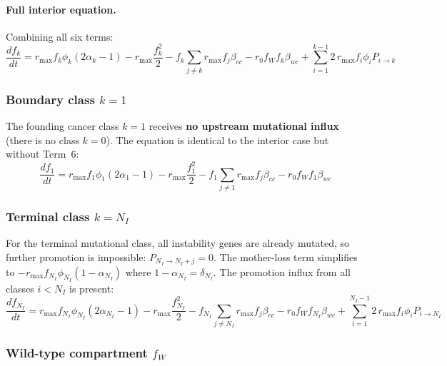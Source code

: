 \documentclass[11pt,a4paper]{article}
\begin{document}
\paragraph{Full interior equation.} Combining all six terms:
\begin{equation}
    \boxed{\frac{df_k}{dt} = r_{\text{max}} f_k \phi_k (2\alpha_k - 1)
    - r_{\text{max}} \frac{f_k^2}{2}
    - f_k \!\sum_{j \neq k}\! r_{\text{max}} f_j \beta_{cc}
    - r_0 f_W f_k \beta_{wc}
    + \sum_{i=1}^{k-1} 2\, r_{\text{max}} f_i \phi_i P_{i \to k}}
\end{equation}

\subsubsection*{Boundary class $k = 1$}

The founding cancer class $k=1$ receives \textbf{no upstream mutational influx} (there is no class $k=0$). The equation is identical to the interior case but without Term~6:
\begin{equation}
    \frac{df_1}{dt} = r_{\text{max}} f_1 \phi_1 (2\alpha_1 - 1) - r_{\text{max}} \frac{f_1^2}{2} - f_1 \sum_{j \neq 1} r_{\text{max}} f_j \beta_{cc} - r_0 f_W f_1 \beta_{wc}
\end{equation}

\subsubsection*{Terminal class $k = N_I$}

For the terminal mutational class, all instability genes are already mutated, so further promotion is impossible: $P_{N_I \to N_I+j} = 0$. The mother-loss term simplifies to $-r_{\text{max}} f_{N_I} \phi_{N_I} (1 - \alpha_{N_I})$ where $1 - \alpha_{N_I} = \delta_{N_I}$. The promotion influx from all classes $i < N_I$ is present:
\begin{equation}
    \frac{df_{N_I}}{dt} = r_{\text{max}} f_{N_I} \phi_{N_I} (2\alpha_{N_I} - 1) - r_{\text{max}} \frac{f_{N_I}^2}{2} - f_{N_I} \sum_{j \neq N_I} r_{\text{max}} f_j \beta_{cc} - r_0 f_W f_{N_I} \beta_{wc} + \sum_{i=1}^{N_I-1} 2\, r_{\text{max}} f_i \phi_i P_{i \to N_I}
\end{equation}

\subsubsection*{Wild-type compartment $f_W$}
\end{document}
